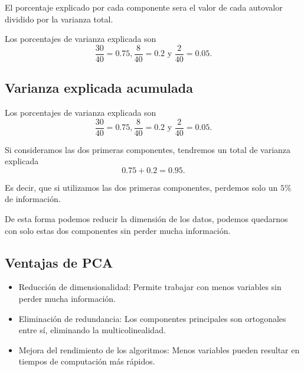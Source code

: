 \documentclass[a4paper]{article}
\begin{document}
El porcentaje explicado por cada componente sera el valor de cada autovalor dividido por la varianza total.

Los porcentajes de varianza explicada son
$$\frac{30}{40} = 0.75, \frac{8}{40} = 0.2 \text{ y } \frac{2}{40} = 0.05.$$

\subsection{Varianza explicada acumulada}

Los porcentajes de varianza explicada son
$$\frac{30}{40} = 0.75, \frac{8}{40} = 0.2 \text{ y } \frac{2}{40} = 0.05.$$

Si consideramos las dos primeras componentes, tendremos un total de varianza explicada
$$0.75 + 0.2 = 0.95.$$

Es decir, que si utilizamos las dos primeras componentes, perdemos solo un $5\%$ de información.

De esta forma podemos reducir la dimensión de los datos, podemos quedarnos con solo estas dos componentes sin perder mucha información.

\subsection{Ventajas de PCA}
\begin{itemize}
    \item Reducción de dimensionalidad: Permite trabajar con menos variables sin perder mucha información.
    \item Eliminación de redundancia: Los componentes principales son ortogonales entre sí, eliminando la multicolinealidad.
    \item Mejora del rendimiento de los algoritmos: Menos variables pueden resultar en tiempos de computación más rápidos.
\end{itemize}
\end{document}
